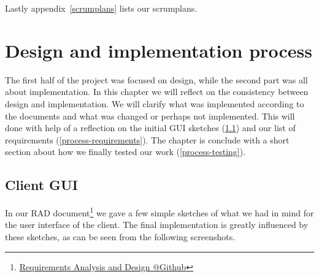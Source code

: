 \documentclass[a4paper]{article}
\makeatletter
\newcommand{\urlRAD}{https://github.com/FelixAkk/synthbio/raw/master/deliverables/rad/rad.pdf}
\newcommand{\hrefRAD}{\href{\urlRAD}{Requirements Analysis and Design @Github}}
\makeatother
\begin{document}
Lastly appendix~\ref{scrumplans} lists our scrumplans.




\section{Design and implementation process}
\label{design-implementation}
The first half of the project was focused on design, while the second part was all about implementation. In this chapter we will reflect on the consistency between design and implementation. We will clarify what was implemented according to the documents and what was changed or perhaps not implemented. This will done with help of a reflection on the initial GUI sketches (\ref{process-gui}) and our list of requirements (\ref{process-requirements}).
The chapter is conclude with a short section about how we finally tested our work (\ref{process-testing}).

\subsection{Client GUI}
\label{process-gui}
In our RAD document\footnote{\hrefRAD} we gave a few simple sketches of what we had in mind for the user interface of the client. The final implementation is greatly influenced by these sketches, as can be seen from the following screenshots.\\
\end{document}
